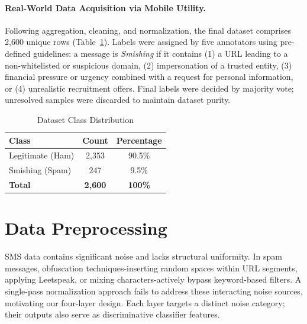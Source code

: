 \documentclass[conference]{IEEEtran}
\begin{document}
\paragraph{Real-World Data Acquisition via Mobile Utility.}

Following aggregation, cleaning, and normalization, the final dataset
comprises 2,600 unique rows (Table~\ref{tab:dataset}). Labels were assigned
by five annotators using pre-defined guidelines: a message is
\textit{Smishing} if it contains (1) a URL leading to a non-whitelisted
or suspicious domain, (2) impersonation of a trusted entity, (3) financial
pressure or urgency combined with a request for personal information, or
(4) unrealistic recruitment offers. Final labels were decided by majority
vote; unresolved samples were discarded to maintain dataset purity.

\begin{table}[htbp]
    \caption{Dataset Class Distribution}
    \label{tab:dataset}
    \centering
    \begin{tabular}{lcc}
        \toprule
        \textbf{Class} & \textbf{Count} & \textbf{Percentage} \\
        \midrule
        Legitimate (Ham) & 2,353 & 90.5\% \\
        Smishing (Spam)  & 247   &  9.5\% \\
        \midrule
        \textbf{Total}   & \textbf{2,600} & \textbf{100\%}  \\
        \bottomrule
    \end{tabular}
\end{table}

\section{Data Preprocessing}
\label{sec:preprocess}

SMS data contains significant noise and lacks structural uniformity. In spam
messages, obfuscation techniques-inserting random spaces within URL
segments, applying Leetspeak, or mixing characters-actively bypass
keyword-based filters. A single-pass normalization approach fails to address
these interacting noise sources, motivating our four-layer design. Each layer
targets a distinct noise category; their outputs also serve as discriminative
classifier features.
\end{document}
